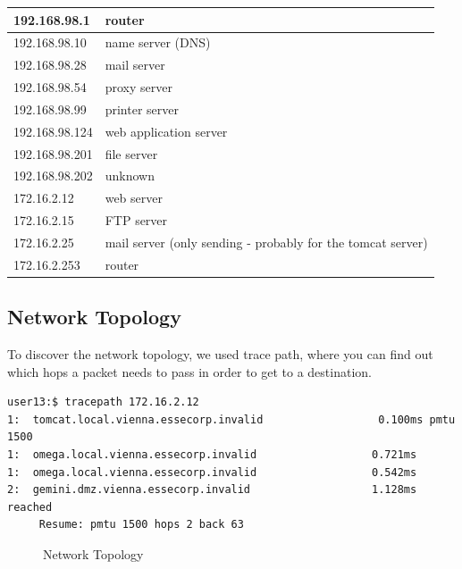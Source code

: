 \documentclass[12pt,a4paper,titlepage,oneside]{scrartcl}
\begin{document}
\begin{tabular}{l | l}
\hline
192.168.98.1 & router \bigstrut \\ \hline
192.168.98.10 & name server (DNS) \bigstrut \\ \hline
192.168.98.28 & mail server \bigstrut \\ \hline
192.168.98.54 & proxy server \bigstrut \\ \hline
192.168.98.99 & printer server \bigstrut \\ \hline
192.168.98.124 & web application server \bigstrut \\ \hline
192.168.98.201 & file server \bigstrut \\ \hline
192.168.98.202 & unknown \bigstrut \\ \hline
172.16.2.12 & web server \bigstrut \\ \hline
172.16.2.15 & FTP server \bigstrut \\ \hline
172.16.2.25 & mail server (only sending - probably for the tomcat server) \bigstrut \\ \hline
172.16.2.253 & router \bigstrut \\ \hline
\end{tabular}

\subsection{Network Topology}
To discover the network topology, we used trace path, where you can find out which hops a packet needs to pass in order to get to a destination.

\begin{lstlisting}[style=simple]
user13:$ tracepath 172.16.2.12
1:  tomcat.local.vienna.essecorp.invalid                  0.100ms pmtu 1500
1:  omega.local.vienna.essecorp.invalid                  0.721ms 
1:  omega.local.vienna.essecorp.invalid                  0.542ms 
2:  gemini.dmz.vienna.essecorp.invalid                   1.128ms reached
     Resume: pmtu 1500 hops 2 back 63 
\end{lstlisting}

\begin{figure}[h!]
  \centering
  \caption{Network Topology}
\end{figure}
\end{document}
